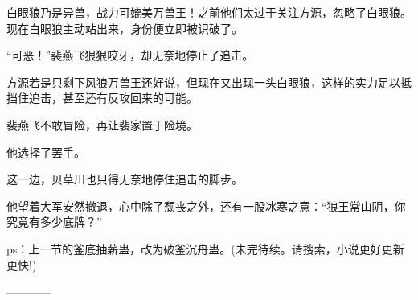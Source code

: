\begin{this_body}
白眼狼乃是异兽，战力可媲美万兽王！之前他们太过于关注方源，忽略了白眼狼。现在白眼狼主动站出来，身份便立即被识破了。

“可恶！”裴燕飞狠狠咬牙，却无奈地停止了追击。

方源若是只剩下风狼万兽王还好说，但现在又出现一头白眼狼，这样的实力足以抵挡住追击，甚至还有反攻回来的可能。

裴燕飞不敢冒险，再让裴家置于险境。

他选择了罢手。

这一边，贝草川也只得无奈地停住追击的脚步。

他望着大军安然撤退，心中除了颓丧之外，还有一股冰寒之意：“狼王常山阴，你究竟有多少底牌？”

ps：上一节的釜底抽薪蛊，改为破釜沉舟蛊。(未完待续。请搜索，小说更好更新更快!)

------------

\end{this_body}


